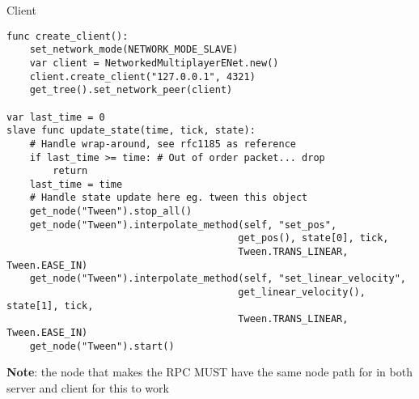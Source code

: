 \begin{frame}[fragile]{Client}
    
\begin{lstlisting}
func create_client():
	set_network_mode(NETWORK_MODE_SLAVE)
	var client = NetworkedMultiplayerENet.new()
	client.create_client("127.0.0.1", 4321)
	get_tree().set_network_peer(client)

var last_time = 0
slave func update_state(time, tick, state):
	# Handle wrap-around, see rfc1185 as reference
	if last_time >= time: # Out of order packet... drop
		return
	last_time = time
	# Handle state update here eg. tween this object
	get_node("Tween").stop_all()
	get_node("Tween").interpolate_method(self, "set_pos", 
                                        get_pos(), state[0], tick,
                                        Tween.TRANS_LINEAR, Tween.EASE_IN)
	get_node("Tween").interpolate_method(self, "set_linear_velocity", 
                                        get_linear_velocity(), state[1], tick, 
                                        Tween.TRANS_LINEAR, Tween.EASE_IN)
	get_node("Tween").start()
\end{lstlisting}

\footnotesize{\textbf{Note}: the node that makes the RPC MUST have the same node path for in both server and client for this to work}
    
\end{frame}
